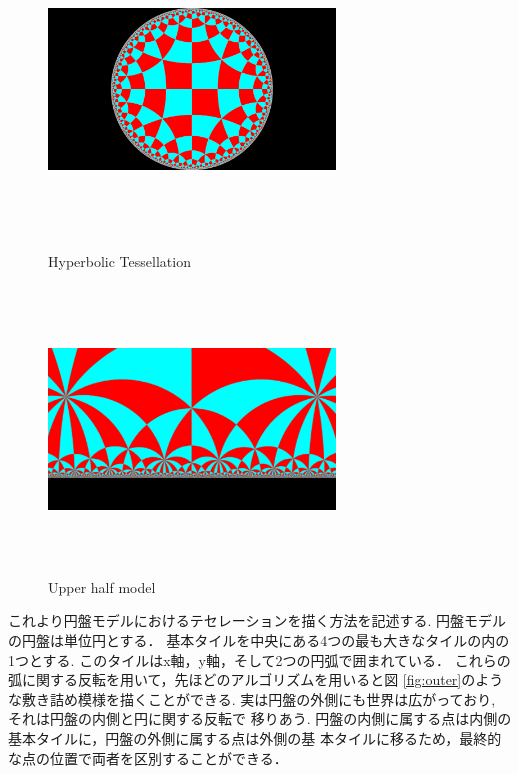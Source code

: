 \begin{figure}[h!tbp]
 \begin{minipage}{0.49\hsize}
  \center
  \includegraphics[width=3in, height=3in,
  keepaspectratio]{../img/tessellation/hyperbolicTessellation.pdf}
  \caption{Hyperbolic Tessellation}
  \label{fig:hyperbolicTessellation}
 \end{minipage}
 \hspace*{\fill}
 \begin{minipage}{0.49\hsize}
  \center
  \includegraphics[width=3in, height=3in, keepaspectratio]{../img/tessellation/upperHalf.pdf}
  \caption{Upper half model}
  \label{fig:upperHalf}
 \end{minipage}
\end{figure}

これより円盤モデルにおけるテセレーションを描く方法を記述する.
円盤モデルの円盤は単位円とする．
基本タイルを中央にある4つの最も大きなタイルの内の1つとする.
このタイルはx軸，y軸，そして2つの円弧で囲まれている．
これらの弧に関する反転を用いて，先ほどのアルゴリズムを用いると図
\ref{fig:outer}のような敷き詰め模様を描くことができる.
実は円盤の外側にも世界は広がっており, それは円盤の内側と円に関する反転で
移りあう.
円盤の内側に属する点は内側の基本タイルに，円盤の外側に属する点は外側の基
本タイルに移るため，最終的な点の位置で両者を区別することができる．


